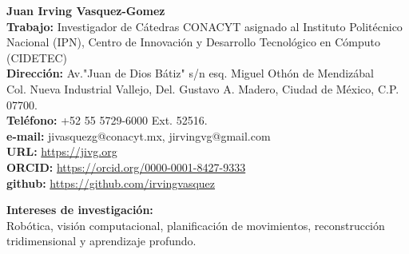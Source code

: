 \documentclass[10pt]{article}
\begin{document}
\begin{center}
{\bf {\Large Juan Irving Vasquez-Gomez}}
\vspace{0.5cm}
\\
\textbf{Trabajo:} Investigador de Cátedras CONACYT asignado al Instituto Politécnico Nacional (IPN), Centro de Innovación y Desarrollo Tecnológico en Cómputo (CIDETEC) \\ 
\textbf{Dirección:} Av."Juan de Dios Bátiz" s/n esq. Miguel Othón de Mendizábal \\
 Col. Nueva Industrial Vallejo, Del. Gustavo A. Madero, Ciudad de México, C.P. 07700. \\
\textbf{Teléfono:} +52 55 5729-6000 Ext. 52516. \\
\textbf{e-mail:} jivasquezg@conacyt.mx, jirvingvg@gmail.com\\
\textbf{URL:} \url{https://jivg.org} \\
\textbf{ORCID:} \url{https://orcid.org/0000-0001-8427-9333} \\
\textbf{github:} \url{https://github.com/irvingvasquez}

\end{center}

\begin{center}
{\bf Intereses de investigación:} \\ Robótica, visión computacional, planificación de movimientos, reconstrucción tridimensional y aprendizaje profundo.
\end{center}
\end{document}
